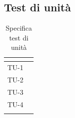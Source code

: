 \subsection{Test di unità}
\normalsize
\renewcommand{\arraystretch}{1}
\begin{longtable}{|C{2.5cm}|C{13cm}|}
	\hline
	\textbf{\color{title_text}{Test}} & \textbf{\color{title_text}{Specifica}}  \\
	\hline
	\endhead
	{TU-1} &  \\
	\hline
	{TU-2} & \\
	\hline
	{TU-3} & \\
	\hline
	{TU-4} &  \\
	\hline
	\caption{Specifica test di unità}
	\label{tabella:specifica tu}
\end{longtable}
\renewcommand{\arraystretch}{1}
\newpage


